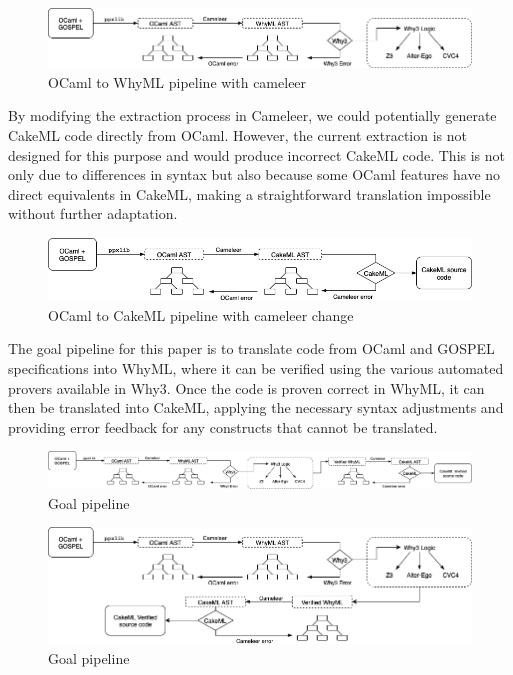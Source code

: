 \begin{figure}[H]
    \centering
    \includegraphics[width=\linewidth]{images/Cameleer_OCaml_WhyML.png}
    \caption{OCaml to WhyML pipeline with cameleer}

\end{figure}

By modifying the extraction process in Cameleer, we could potentially generate CakeML code directly from OCaml. 
However, the current extraction is not designed for this purpose and would produce incorrect CakeML code. This is not 
only due to differences in syntax but also because some OCaml features have no direct equivalents in CakeML, making a 
straightforward translation impossible without further adaptation.

\begin{figure}[H]
    \centering
    \includegraphics[width=\linewidth]{images/Cameleer_OCaml_CakeML.png}
    \caption{OCaml to CakeML pipeline with cameleer change}

\end{figure}

The goal pipeline for this paper is to translate code from OCaml and GOSPEL specifications into WhyML, where it can 
be verified using the various automated provers available in Why3. Once the code is proven correct in WhyML, it can 
then be translated into CakeML, applying the necessary syntax adjustments and providing error feedback for any constructs 
that cannot be translated.

\begin{figure}[H]
    \centering
    \includegraphics[width=\linewidth]{images/Cameleer_OCaml_WhyML_CakeML.png}
    \caption{Goal pipeline}

\end{figure}

\begin{figure}[H]
    \centering
    \includegraphics[width=\linewidth]{images/Goal_Pipeline.png}
    \caption{Goal pipeline}

\end{figure}

